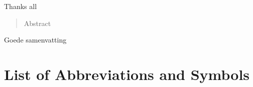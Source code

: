 \documentclass[master=cws,masteroption=se,english]{kulemt}
\begin{document}
\begin{preface}
  Thanks all 
\end{preface}

\listoftodos
\tableofcontents*
\setcounter{tocdepth}{5} %

\begin{abstract}
  Abstract 
\end{abstract}

\begin{abstract*}
  Goede samenvatting
\end{abstract*}

\listoffiguresandtables
\lstlistoflistings
\chapter{List of Abbreviations and Symbols}
\end{document}
